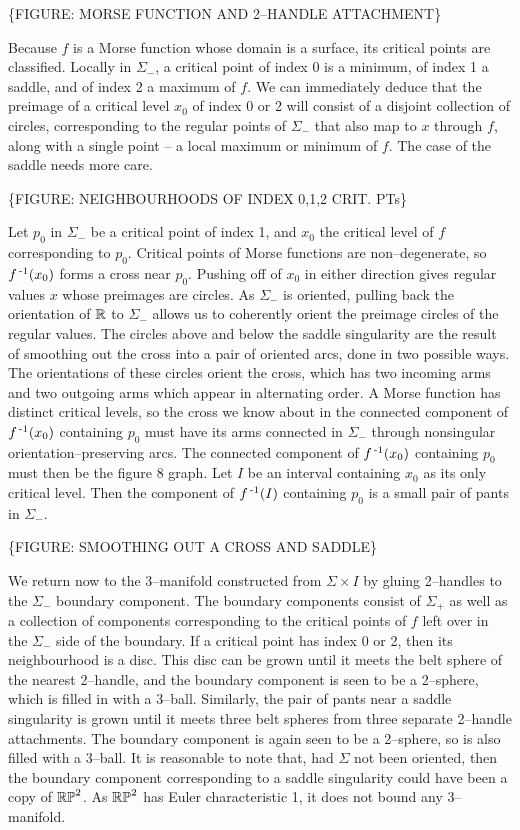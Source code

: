 \{FIGURE: MORSE FUNCTION AND 2--HANDLE ATTACHMENT\}

Because $f$ is a Morse function whose domain is a surface, its critical points are classified.
Locally in $\Sigma_-$, a critical point of index 0 is a minimum, of index 1 a saddle, and of index 2 a maximum of $f$.
We can immediately deduce that the preimage of a critical level $x_0$ of index 0 or 2 will consist of a disjoint collection of circles, corresponding to the regular points of $\Sigma_-$ that also map to $x$ through $f$, along with a single point -- a local maximum or minimum of $f$.
The case of the saddle needs more care.

\{FIGURE: NEIGHBOURHOODS OF INDEX 0,1,2 CRIT. PTs\}

Let $p_0$ in $\Sigma_-$ be a critical point of index 1, and $x_0$ the critical level of $f$ corresponding to $p_0$.
Critical points of Morse functions are non--degenerate, so $f^{\,\text{-}1} (x_0)$ forms a cross near $p_0$.
Pushing off of $x_0$ in either direction gives regular values $x$ whose preimages are circles.
As $\Sigma_-$ is oriented, pulling back the orientation of $\mathbb{R}$ to $\Sigma_-$ allows us to coherently orient the preimage circles of the regular values.
The circles above and below the saddle singularity are the result of smoothing out the cross into a pair of oriented arcs, done in two possible ways.
The orientations of these circles orient the cross, which has two incoming arms and two outgoing arms which appear in alternating order.
A Morse function has distinct critical levels, so the cross we know about in the connected component of $f^{\,\text{-}1}(x_0)$ containing $p_0$ must have its arms connected in $\Sigma_-$ through nonsingular orientation--preserving arcs.
The connected component of $f^{\,\text{-}1}(x_0)$ containing $p_0$ must then be the figure 8 graph.
Let $I$ be an interval containing $x_0$ as its only critical level.
Then the component of $f^{\,\text{-}1}(I)$ containing $p_0$ is a small pair of pants in $\Sigma_-$.

\{FIGURE: SMOOTHING OUT A CROSS AND SADDLE\}

We return now to the 3--manifold constructed from $\Sigma\times I$ by gluing 2--handles to the $\Sigma_-$ boundary component.
The boundary components consist of $\Sigma_+$ as well as a collection of components corresponding to the critical points of $f$ left over in the $\Sigma_-$ side of the boundary.
If a critical point has index 0 or 2, then its neighbourhood is a disc.
This disc can be grown until it meets the belt sphere of the nearest 2--handle, and the boundary component is seen to be a 2--sphere, which is filled in with a 3--ball.
Similarly, the pair of pants near a saddle singularity is grown until it meets three belt spheres from three separate 2--handle attachments.
The boundary component is again seen to be a 2--sphere, so is also filled with a 3--ball.
It is reasonable to note that, had $\Sigma$ not been oriented, then the boundary component corresponding to a saddle singularity could have been a copy of $\mathbb{RP}^2$.
As $\mathbb{RP}^2$ has Euler characteristic 1, it does not bound any 3--manifold.

